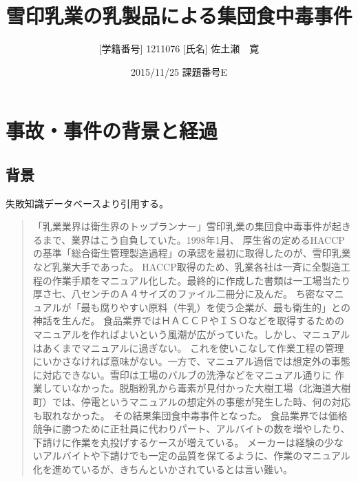 \documentclass[twocolumn,titlepage]{jsarticle}
\title{雪印乳業の乳製品による集団食中毒事件}
\author{[学籍番号] 1211076 [氏名] 佐土瀬　寛}
\date{2015/11/25 課題番号E}
\begin{document}
\maketitle
\section{事故・事件の背景と経過}
\subsection{背景}
失敗知識データベース\cite{database}より引用する。

\begin{quote}
「乳業業界は衛生界のトップランナー」雪印乳業の集団食中毒事件が起きるまで、業界はこう自負していた。1998年1月、
厚生省の定めるHACCPの基準「総合衛生管理製造過程」の承認を最初に取得したのが、雪印乳業など乳業大手であった。
HACCP取得のため、乳業各社は一斉に全製造工程の作業手順をマニュアル化した。最終的に作成した書類は一工場当たり厚さ七、八センチのＡ４サイズのファイル二冊分に及んだ。
ち密なマニュアルが「最も腐りやすい原料（牛乳）を使う企業が、最も衛生的」との神話を生んだ。
食品業界ではＨＡＣＣＰやＩＳＯなどを取得するためのマニュアルを作ればよいという風潮が広がっていた。しかし、マニュアルはあくまでマニュアルに過ぎない。
これを使いこなして作業工程の管理にいかさなければ意味がない。一方で、マニュアル過信では想定外の事態に対応できない。雪印は工場のバルブの洗浄などをマニュアル通りに
作業していなかった。脱脂粉乳から毒素が見付かった大樹工場（北海道大樹町）では、停電というマニュアルの想定外の事態が発生した時、何の対応も取れなかった。
その結果集団食中毒事件となった。
食品業界では価格競争に勝つために正社員に代わりパート、アルバイトの数を増やしたり、下請けに作業を丸投げするケースが増えている。
メーカーは経験の少ないアルバイトや下請けでも一定の品質を保てるように、作業のマニュアル化を進めているが、きちんといかされているとは言い難い。
\end{quote}
\end{document}

